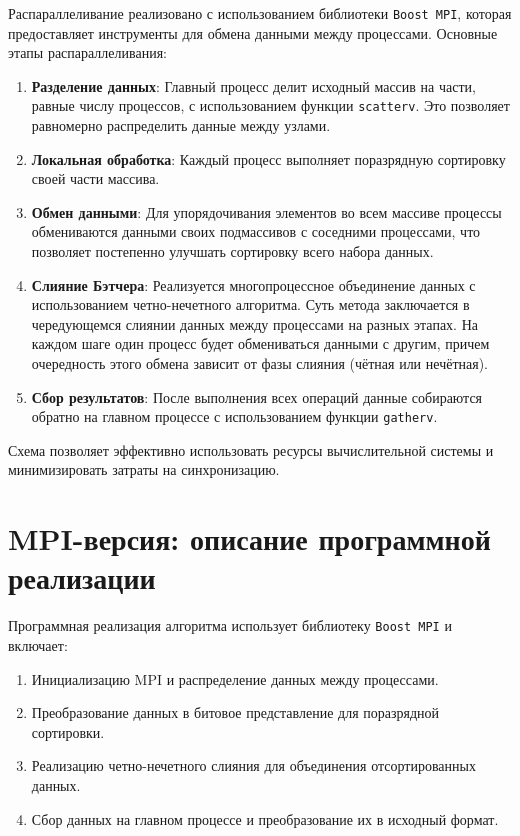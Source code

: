 \documentclass[a4paper,12pt]{article}
\begin{document}
Распараллеливание реализовано с использованием библиотеки \texttt{Boost MPI}, которая предоставляет инструменты для обмена данными между процессами. Основные этапы распараллеливания:
\begin{enumerate}
    \item \textbf{Разделение данных}:
    Главный процесс делит исходный массив на части, равные числу процессов, с использованием функции \texttt{scatterv}. Это позволяет равномерно распределить данные между узлами.
    \item \textbf{Локальная обработка}:
    Каждый процесс выполняет поразрядную сортировку своей части массива.
    \item \textbf{Обмен данными}:
    Для упорядочивания элементов во всем массиве процессы обмениваются данными своих подмассивов с соседними процессами, что позволяет постепенно улучшать сортировку всего набора данных.
    \item \textbf{Слияние Бэтчера}:
    Реализуется многопроцессное объединение данных с использованием четно-нечетного алгоритма. Суть метода заключается в чередующемся слиянии данных между процессами на разных этапах.
    На каждом шаге один процесс будет обмениваться данными с другим, причем очередность этого обмена зависит от фазы слияния (чётная или нечётная).
    \item \textbf{Сбор результатов}:
    После выполнения всех операций данные собираются обратно на главном процессе с использованием функции \texttt{gatherv}.
\end{enumerate}

Схема позволяет эффективно использовать ресурсы вычислительной системы и минимизировать затраты на синхронизацию.

\newpage

\section*{\centering MPI-версия: описание программной реализации}

Программная реализация алгоритма использует библиотеку \texttt{Boost MPI} и включает:
\begin{enumerate}
    \item Инициализацию MPI и распределение данных между процессами.
    \item Преобразование данных в битовое представление для поразрядной сортировки.
    \item Реализацию четно-нечетного слияния для объединения отсортированных данных.
    \item Сбор данных на главном процессе и преобразование их в исходный формат.
\end{enumerate}
\end{document}
